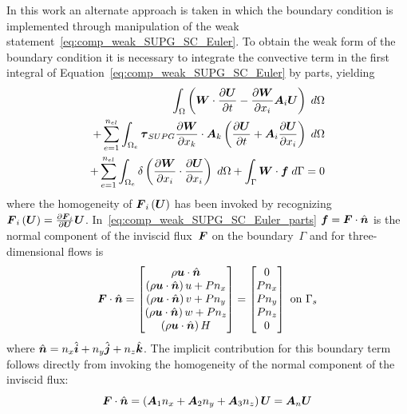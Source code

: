 In this work an alternate approach is taken in which the boundary condition is implemented through manipulation of the weak statement~\eqref{eq:comp_weak_SUPG_SC_Euler}. To obtain the weak form of the boundary condition it is necessary to integrate the convective term in the first integral of Equation~\eqref{eq:comp_weak_SUPG_SC_Euler} by parts, yielding
\begin{eqnarray}
  \label{eq:comp_weak_SUPG_SC_Euler_parts}
  \int_\Omega  \left({\boldsymbol{W}}\cdot{\frac{\partial{{\boldsymbol{U}}}}{\partial{t}}} - {\frac{\partial{{\boldsymbol{W}}}}{\partial{x_i}}}{\boldsymbol{A}}_i{\boldsymbol{U}} \right) \; d\Omega \nonumber \\
  + \sum_{e=1}^{n_{el}} \int_{\Omega_e} {\boldsymbol{\tau}}_{SUPG} {\frac{\partial{{\boldsymbol{W}}}}{\partial{x_k}}}\cdot{\boldsymbol{A}}_k
  \left( {\frac{\partial{{\boldsymbol{U}}}}{\partial{t}}} + {\boldsymbol{A}}_i {\frac{\partial{{\boldsymbol{U}}}}{\partial{x_i}}} \right) \; d\Omega  \nonumber \\
  + \sum_{e=1}^{n_{el}} \int_{\Omega_e} \delta \left({\frac{\partial{{\boldsymbol{W}}}}{\partial{x_i}}}\cdot{\frac{\partial{{\boldsymbol{U}}}}{\partial{x_i}}}\right)\; d\Omega
   + \int_\Gamma {\boldsymbol{W}}\cdot{\boldsymbol{f}} \; d\Gamma = 0
\end{eqnarray}
where the homogeneity of ${\boldsymbol{F}}_i\left({\boldsymbol{U}}\right)$ has been invoked by recognizing ${\boldsymbol{F}}_i\left({\boldsymbol{U}}\right)={\frac{\partial{{\boldsymbol{F}}_i}}{\partial{{\boldsymbol{U}}}}}{\boldsymbol{U}}$.  In~\eqref{eq:comp_weak_SUPG_SC_Euler_parts} ${\boldsymbol{f}}={\boldsymbol{F}}\cdot\hat{{\boldsymbol{n}}}$ is the normal component of the inviscid flux~${\boldsymbol{F}}$ on the boundary~$\Gamma$ and for three-dimensional flows is
\begin{equation}
  \label{eq:normal_inviscid_flux_wall}
  {\boldsymbol{F}}\cdot\hat{{\boldsymbol{n}}} =
  \begin{bmatrix}
    \rho {\boldsymbol{u}}\cdot\hat{{\boldsymbol{n}}}                        \\
    \left(\rho {\boldsymbol{u}}\cdot\hat{{\boldsymbol{n}}}\right) u + P n_x \\
    \left(\rho {\boldsymbol{u}}\cdot\hat{{\boldsymbol{n}}}\right) v + P n_y \\
    \left(\rho {\boldsymbol{u}}\cdot\hat{{\boldsymbol{n}}}\right) w + P n_z \\
    \left(\rho {\boldsymbol{u}}\cdot\hat{{\boldsymbol{n}}}\right) H
  \end{bmatrix} = 
  \begin{bmatrix}
    0     \\
    P n_x \\
    P n_y \\
    P n_z \\
    0
  \end{bmatrix} \mbox{ on } \Gamma_s
\end{equation}
where $\hat{{\boldsymbol{n}}}=n_x\hat{{\boldsymbol{i}}} + n_y\hat{{\boldsymbol{j}}} + n_z\hat{{\boldsymbol{k}}}$.  The implicit contribution for this boundary term follows directly from invoking the homogeneity of the normal component of the inviscid flux:
\begin{equation}
  \label{eq:inviscid_normal_flux_jacobian}
  {\boldsymbol{F}}\cdot\hat{{\boldsymbol{n}}} =    
  \left({\boldsymbol{A}}_1 n_x + {\boldsymbol{A}}_2 n_y + {\boldsymbol{A}}_3 n_z\right) {\boldsymbol{U}} =
  {\boldsymbol{A}}_n{\boldsymbol{U}}
\end{equation}
